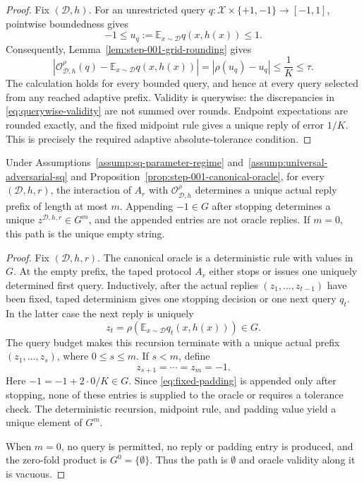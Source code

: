 \begin{proof}
Fix \((\mathcal D,h)\).  For an unrestricted query
\(q:\mathcal X\times\{+1,-1\}\to[-1,1]\), pointwise boundedness gives
\[
-1\le u_q:=\mathbb E_{x\sim\mathcal D}q(x,h(x))\le1.
\]
Consequently, Lemma~\ref{lem:step-001-grid-rounding} gives
\[
\left|
\mathcal O^\rho_{\mathcal D,h}(q)
-\mathbb E_{x\sim\mathcal D}q(x,h(x))
\right|
=|\rho(u_q)-u_q|
\le\frac1K\le\tau.
\tag{A.4}\label{eq:querywise-validity}
\]
The calculation holds for every bounded query, and hence at every query
selected from any reached adaptive prefix.  Validity is querywise: the
discrepancies in \eqref{eq:querywise-validity} are not summed over rounds.
Endpoint expectations are rounded exactly, and the fixed midpoint rule gives
a unique reply of error \(1/K\).  This is precisely the required adaptive
absolute-tolerance condition.
\end{proof}

\begin{proposition}
\label{prop:step-001-padded-path}
Under Assumptions~\ref{assump:sq-parameter-regime}
and~\ref{assump:universal-adversarial-sq} and
Proposition~\ref{prop:step-001-canonical-oracle}, for every
\((\mathcal D,h,r)\), the interaction of \(A_r\) with
\(\mathcal O^\rho_{\mathcal D,h}\) determines a unique actual reply prefix
of length at most \(m\).  Appending \(-1\in G\) after stopping determines a
unique \(z^{\mathcal D,h,r}\in G^m\), and the appended entries are not
oracle replies.  If \(m=0\), this path is the unique empty string.
\end{proposition}

\begin{proof}
Fix \((\mathcal D,h,r)\).  The canonical oracle is a deterministic rule
with values in \(G\).  At the empty prefix, the taped protocol \(A_r\)
either stops or issues one uniquely determined first query.  Inductively,
after the actual replies \((z_1,\ldots,z_{t-1})\) have been fixed, taped
determinism gives one stopping decision or one next query \(q_t\).  In the
latter case the next reply is uniquely
\[
z_t=\rho\!\left(
\mathbb E_{x\sim\mathcal D}q_t(x,h(x))
\right)\in G.
\tag{A.5}\label{eq:canonical-recursion}
\]
The query budget makes this recursion terminate with a unique actual prefix
\((z_1,\ldots,z_s)\), where \(0\le s\le m\).  If \(s<m\), define
\[
z_{s+1}=\cdots=z_m=-1.
\tag{A.6}\label{eq:fixed-padding}
\]
Here \(-1=-1+2\cdot0/K\in G\).  Since \eqref{eq:fixed-padding} is appended
only after stopping, none of these entries is supplied to the oracle or
requires a tolerance check.  The deterministic recursion, midpoint rule,
and padding value yield a unique element of \(G^m\).

When \(m=0\), no query is permitted, no reply or padding entry is produced,
and the zero-fold product is \(G^0=\{\emptyset\}\).  Thus the path is
\(\emptyset\) and oracle validity along it is vacuous.
\end{proof}

